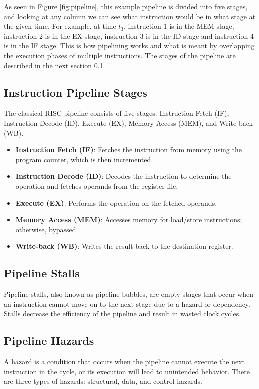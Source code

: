 As seen in Figure \ref{fig:pipeline}, this example pipeline is divided into five stages, and looking at any column we can see what instruction would be in what stage at the given time. For example, at time $t_3$, instruction 1 is in the MEM stage, instruction 2 is in the EX stage, instruction 3 is in the ID stage and instruction 4 is in the IF stage. This is how pipelining works and what is meant by overlapping the execution phases of multiple instructions. The stages of the pipeline are described in the next section \ref{sec:pipeline_stages}.


\subsection {Instruction Pipeline Stages}\label{sec:pipeline_stages}
The classical RISC pipeline consists of five stages: Instruction Fetch (IF), Instruction Decode (ID), Execute (EX), Memory Access (MEM), and Write-back (WB)\cite{patterson1994computer}\cite{he2023survey}. 

\begin{itemize}
     \item \textbf{Instruction Fetch (IF)}: Fetches the instruction from memory using the program counter, which is then incremented.
     \item \textbf{Instruction Decode (ID)}: Decodes the instruction to determine the operation and fetches operands from the register file.
     \item \textbf{Execute (EX)}: Performs the operation on the fetched operands.
     \item \textbf{Memory Access (MEM)}: Accesses memory for load/store instructions; otherwise, bypassed.
     \item \textbf{Write-back (WB)}: Writes the result back to the destination register.
\end{itemize}


\subsection {Pipeline Stalls}\label{sec:pipeline_stalls}
Pipeline stalls, also known as pipeline bubbles, are empty stages that occur when an instruction cannot move on to the next stage due to a hazard or dependency. Stalls decrease the efficiency of the pipeline and result in wasted clock cycles\cite{patterson1994computer}.

\subsection {Pipeline Hazards}\label{sec:pipeline_hazards}
A hazard is a condition that occurs when the pipeline cannot execute the next instruction in the cycle, or its execution will lead to unintended behavior. There are three types of hazards: structural, data, and control hazards\cite{olanrewaju2017design}.

